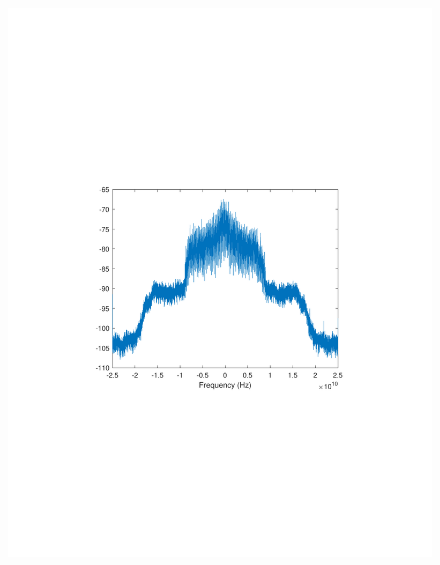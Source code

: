 \begin{refsection}
\begin{figure}[H]
	\centering
	\begin{minipage}{0.30\textwidth}
		\centering
		\includegraphics[clip, trim=4cm 8cm 4cm 8cm, width=1\textwidth]{./sdf/m_qam_system/figures/expResults/intradyne/0_16GBdInSig13dB_bfFec.pdf}
		\label{fig:16GBdEyeBefFec}
	\end{minipage}
	\begin{minipage}{0.30\textwidth}
		\centering

\end{minipage}
\end{figure}
\end{refsection}
